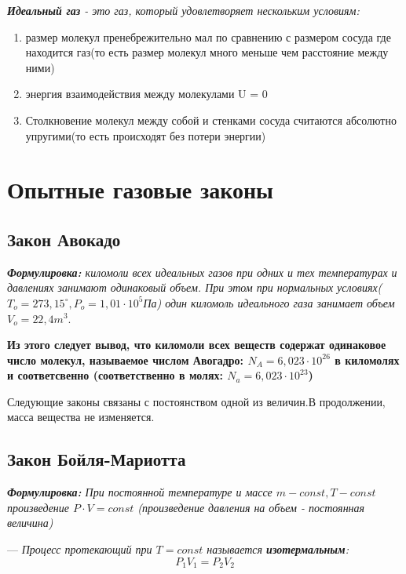 \textit{\textbf{Идеальный газ} - это газ, который удовлетворяет нескольким условиям:}
\begin{enumerate}
    \item размер молекул пренебрежительно мал по сравнению с размером сосуда где находится газ(то есть размер молекул много меньше чем расстояние между ними)
    \item энергия взаимодействия между молекулами U = 0
    \item Столкновение молекул между собой и стенками сосуда считаются абсолютно упругими(то есть происходят без потери энергии)
\end{enumerate}
\section{Опытные газовые законы}

\subsection{Закон Авокадо}
\textit{\textbf{Формулировка:} киломоли всех идеальных газов при одних и тех температурах и давлениях занимают одинаковый объем. При этом при нормальных условиях($T_o = 273,15^{\circ}, P_o = 1,01 \cdot 10^5$Па) один киломоль идеального газа занимает объем $V_o = 22,4m^3$}.

\vspace{5px}

\textbf{Из этого следует вывод, что киломоли всех веществ содержат одинаковое число молекул, называемое числом Авогадро:
    $N_A = 6,023 \cdot 10^{26}$ в киломолях и соответсвенно (соответственно в молях: $N_a = 6,023 \cdot 10^{23}$)}

\vspace{5px}

Следующие законы связаны с постоянством одной из величин.В продолжении, масса вещества не изменяется.

\subsection{Закон Бойля-Мариотта}
\textit{\textbf{Формулировка:} При постоянной температуре и массе $m - const, T- const$ произведение $P \cdot V = const$ (произведение давления на объем - постоянная величина)}

\vspace{5px}

--- \textit{Процесс протекающий при $T = const$ называется \textbf{изотермальным}: }
\[ P_1V_1 = P_2V_2\]

